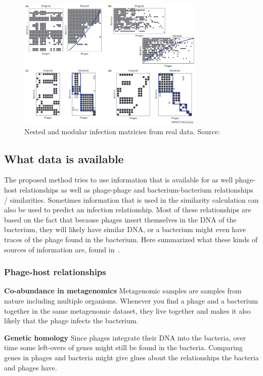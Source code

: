 \documentclass{article}
\begin{document}
\begin{figure}[htb]
\centering
\includegraphics[width=0.8\textwidth]{img/nested-vs-modular.png}
\caption{Nested and modular infection matricies from real data. Source:~\cite{weitz2013phage}}
\end{figure}

\subsection{What data is available}

The proposed method tries to use information that is available for as well
phage-host relationships as well as phage-phage and bacterium-bacterium
relationships / similarities. Sometimes information that is used in the 
similarity calculation can also be used to predict an infection relationship.
Most of these relationships are based on the fact that because phages insert
themselves in the DNA of the bacterium, they will likely have similar DNA, 
or a bacterium might even have traces of the phage found in the bacterium.
Here summarized what these kinds of sources
of information are, found in~\cite{edwards2016computational}.

\subsubsection{Phage-host relationships}

\textbf{Co-abundance in metagenomics} Metagenomic samples are samples from
nature including multiple organisms. Whenever you find a phage and a
bacterium together in the same metagenomic dataset, they live together and
makes it also likely that the phage infects the bacterium.

\textbf{Genetic homology} Since phages integrate their DNA into the bacteria, 
over time some left-overs of genes might still be found in the bacteria. 
Comparing genes in phages and bacteria might give glues about the relationships
the bacteria and phages have.
\end{document}
